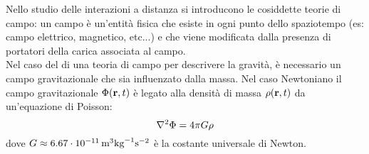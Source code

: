
Nello studio delle interazioni a distanza si introducono le cosiddette teorie di campo: un campo è un'entità fisica che esiste in ogni punto dello spaziotempo (es: campo elettrico, magnetico, etc...) e che viene modificata dalla presenza di portatori della carica associata al campo.\\
Nel caso del di una teoria di campo per descrivere la gravità, è necessario un campo gravitazionale che sia influenzato dalla massa. Nel caso Newtoniano il campo gravitazionale $ \Phi(\mathbf{r},t) $ è legato alla densità di massa $ \rho(\mathbf{r},t) $ da un'equazione di Poisson:
\begin{equation}
  \nabla^2\Phi = 4\pi G \rho
  \label{eq:0.1}
\end{equation}
dove $ G \approx 6.67\cdot10^{-11}\,\text{m}^3\text{kg}^{-1}\text{s}^{-2} $ è la costante universale di Newton.
